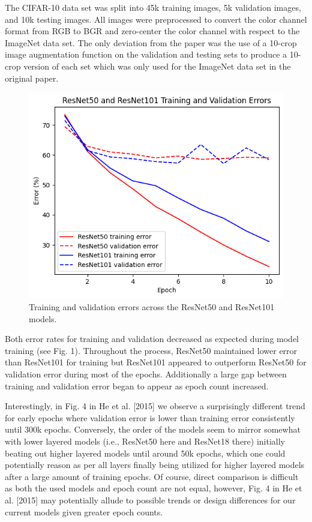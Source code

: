 \documentclass[sigplan]{acmart}
\begin{document}
The CIFAR-10 data set was split into 45k training images, 5k validation images, and 10k testing images. All images were preprocessed to convert the color channel format from RGB to BGR and zero-center the color channel with respect to the ImageNet data set. The only deviation from the paper was the use of a 10-crop image augmentation function on the validation and testing sets to produce a 10-crop version of each set which was only used for the ImageNet data set in the original paper.

\begin{figure}[h]
  \centering
  \includegraphics[width=\linewidth]{resnetErr.png}
  \caption{Training and validation errors across the ResNet50 and ResNet101 models.}
\end{figure}

Both error rates for training and validation decreased as expected during model training (see Fig. 1). Throughout the process, ResNet50 maintained lower error than ResNet101 for training but ResNet101 appeared to outperform ResNet50 for validation error during most of the epochs. Additionally a large gap between training and validation error began to appear as epoch count increased.

Interestingly, in Fig. 4 in He et al. [2015] we observe a surprisingly different trend for early epochs where validation error is lower than training error consistently until 300k epochs. Conversely, the order of the models seem to mirror somewhat with lower layered models (i.e., ResNet50 here and ResNet18 there) initially beating out higher layered models until around 50k epochs, which one could potentially reason as per all layers finally being utilized for higher layered models after a large amount of training epochs. Of course, direct comparison is difficult as both the used models and epoch count are not equal, however, Fig. 4 in He et al. [2015] may potentially allude to possible trends or design differences for our current models given greater epoch counts.
\end{document}
